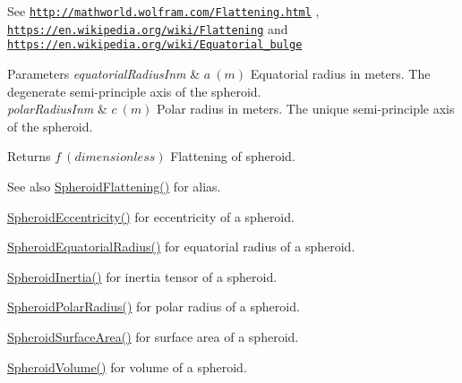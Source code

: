 See \href{http://mathworld.wolfram.com/Flattening.html}{\tt http\+://mathworld.\+wolfram.\+com/\+Flattening.\+html} , \href{https://en.wikipedia.org/wiki/Flattening}{\tt https\+://en.\+wikipedia.\+org/wiki/\+Flattening} and \href{https://en.wikipedia.org/wiki/Equatorial_bulge}{\tt https\+://en.\+wikipedia.\+org/wiki/\+Equatorial\+\_\+bulge} 
\begin{DoxyParams}{Parameters}
{\em equatorial\+Radius\+Inm} & $ a\ (m)$ Equatorial radius in meters. The degenerate semi-\/principle axis of the spheroid. \\
\hline
{\em polar\+Radius\+Inm} & $ c\ (m)$ Polar radius in meters. The unique semi-\/principle axis of the spheroid. \\
\hline
\end{DoxyParams}
\begin{DoxyReturn}{Returns}
$ f\ (dimensionless)$ Flattening of spheroid. 
\end{DoxyReturn}
\begin{DoxySeeAlso}{See also}
\mbox{\hyperlink{group___e_g_x_math-_geometry-3_d-_spheroid-_flattening_ga9822b6e1025edbf7d272949547c53511}{Spheroid\+Flattening()}} for alias. 

\mbox{\hyperlink{group___e_g_x_math-_geometry-3_d-_spheroid-_eccentricity_gab45680528a41bb7a5e15ddc0059156dd}{Spheroid\+Eccentricity()}} for eccentricity of a spheroid. 

\mbox{\hyperlink{group___e_g_x_math-_geometry-3_d-_spheroid-_equatorial_radius_ga1cbe564fee1b509c622d1c6d276158cd}{Spheroid\+Equatorial\+Radius()}} for equatorial radius of a spheroid. 

\mbox{\hyperlink{group___e_g_x_math-_geometry-3_d-_spheroid-_inertia_ga4a6085f1b3504bd682ee6818542ae09e}{Spheroid\+Inertia()}} for inertia tensor of a spheroid. 

\mbox{\hyperlink{group___e_g_x_math-_geometry-3_d-_spheroid-_polar_radius_gad4791a46a7efe39c63c03d2366fdd3d2}{Spheroid\+Polar\+Radius()}} for polar radius of a spheroid. 

\mbox{\hyperlink{group___e_g_x_math-_geometry-3_d-_spheroid-_surface_area_ga5a3580e7ded82cb678a558905f41ae49}{Spheroid\+Surface\+Area()}} for surface area of a spheroid. 

\mbox{\hyperlink{group___e_g_x_math-_geometry-3_d-_spheroid-_volume_ga12125484235e94b8f2580f3476b05b92}{Spheroid\+Volume()}} for volume of a spheroid. 
\end{DoxySeeAlso}
\mbox{\label{group___e_g_x_math-_geometry-3_d-_spheroid-_flattening_ga486adfc58b047197daf87f50b2039ca7}} 
